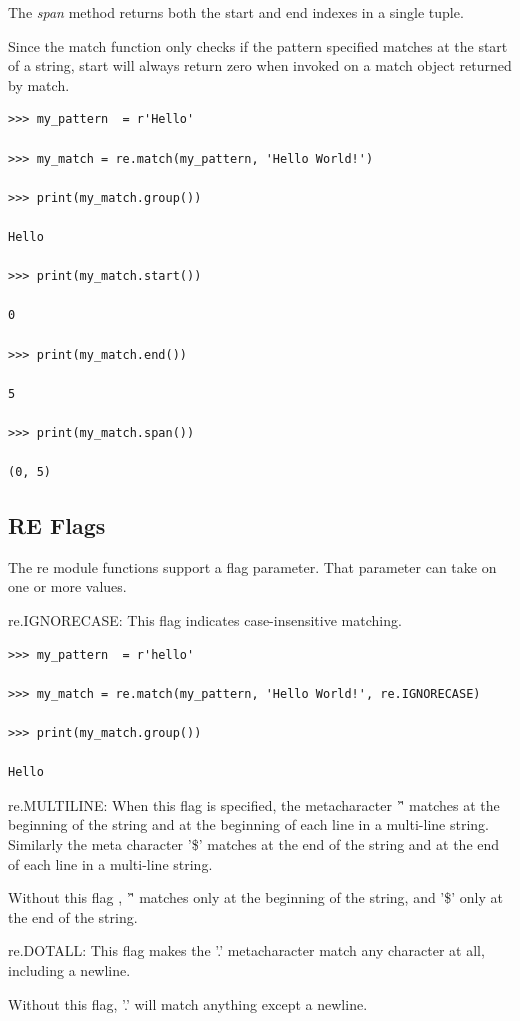\documentclass{article}
\begin{document}
The \textit{span} method returns both the start and end indexes in a single tuple. 

Since the match function only checks if the pattern specified matches at the start of a string, start will always return zero when invoked on a match object returned by match.

\begin{lstlisting}
>>> my_pattern  = r'Hello'

>>> my_match = re.match(my_pattern, 'Hello World!')

>>> print(my_match.group())

Hello

>>> print(my_match.start())

0

>>> print(my_match.end())

5

>>> print(my_match.span())

(0, 5)
\end{lstlisting}

\subsection{RE Flags}
The re module functions support a flag parameter.  That parameter can take on one or more values.

re.IGNORECASE:   This flag indicates case-insensitive matching.  

\begin{lstlisting}
>>> my_pattern  = r'hello'

>>> my_match = re.match(my_pattern, 'Hello World!', re.IGNORECASE)

>>> print(my_match.group())

Hello
\end{lstlisting}

re.MULTILINE:  When this flag is specified, the metacharacter '\^' matches at the beginning of the string and at the beginning of each line in a multi-line string.  Similarly the meta character '\$' matches at the end of the string and at the end of each line in a multi-line string.

Without this flag , '\^' matches only at the beginning of the string, and '\$' only at the end of the string.

re.DOTALL:  This flag makes the '.' metacharacter match any character at all, including a newline.

Without this flag, '.' will match anything except a newline.
\end{document}
